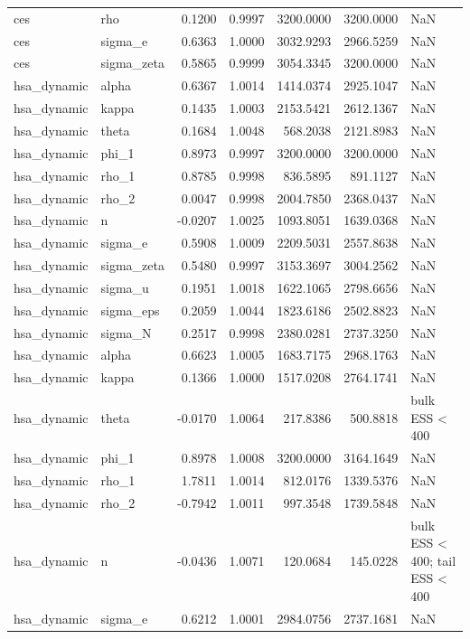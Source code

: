 \begin{tabular}{llrrrrl}
ces & rho & 0.1200 & 0.9997 & 3200.0000 & 3200.0000 & NaN \\
ces & sigma\_e & 0.6363 & 1.0000 & 3032.9293 & 2966.5259 & NaN \\
ces & sigma\_zeta & 0.5865 & 0.9999 & 3054.3345 & 3200.0000 & NaN \\
hsa\_dynamic & alpha & 0.6367 & 1.0014 & 1414.0374 & 2925.1047 & NaN \\
hsa\_dynamic & kappa & 0.1435 & 1.0003 & 2153.5421 & 2612.1367 & NaN \\
hsa\_dynamic & theta & 0.1684 & 1.0048 & 568.2038 & 2121.8983 & NaN \\
hsa\_dynamic & phi\_1 & 0.8973 & 0.9997 & 3200.0000 & 3200.0000 & NaN \\
hsa\_dynamic & rho\_1 & 0.8785 & 0.9998 & 836.5895 & 891.1127 & NaN \\
hsa\_dynamic & rho\_2 & 0.0047 & 0.9998 & 2004.7850 & 2368.0437 & NaN \\
hsa\_dynamic & n & -0.0207 & 1.0025 & 1093.8051 & 1639.0368 & NaN \\
hsa\_dynamic & sigma\_e & 0.5908 & 1.0009 & 2209.5031 & 2557.8638 & NaN \\
hsa\_dynamic & sigma\_zeta & 0.5480 & 0.9997 & 3153.3697 & 3004.2562 & NaN \\
hsa\_dynamic & sigma\_u & 0.1951 & 1.0018 & 1622.1065 & 2798.6656 & NaN \\
hsa\_dynamic & sigma\_eps & 0.2059 & 1.0044 & 1823.6186 & 2502.8823 & NaN \\
hsa\_dynamic & sigma\_N & 0.2517 & 0.9998 & 2380.0281 & 2737.3250 & NaN \\
hsa\_dynamic & alpha & 0.6623 & 1.0005 & 1683.7175 & 2968.1763 & NaN \\
hsa\_dynamic & kappa & 0.1366 & 1.0000 & 1517.0208 & 2764.1741 & NaN \\
hsa\_dynamic & theta & -0.0170 & 1.0064 & 217.8386 & 500.8818 & bulk ESS < 400 \\
hsa\_dynamic & phi\_1 & 0.8978 & 1.0008 & 3200.0000 & 3164.1649 & NaN \\
hsa\_dynamic & rho\_1 & 1.7811 & 1.0014 & 812.0176 & 1339.5376 & NaN \\
hsa\_dynamic & rho\_2 & -0.7942 & 1.0011 & 997.3548 & 1739.5848 & NaN \\
hsa\_dynamic & n & -0.0436 & 1.0071 & 120.0684 & 145.0228 & bulk ESS < 400; tail ESS < 400 \\
hsa\_dynamic & sigma\_e & 0.6212 & 1.0001 & 2984.0756 & 2737.1681 & NaN \\

\end{tabular}
